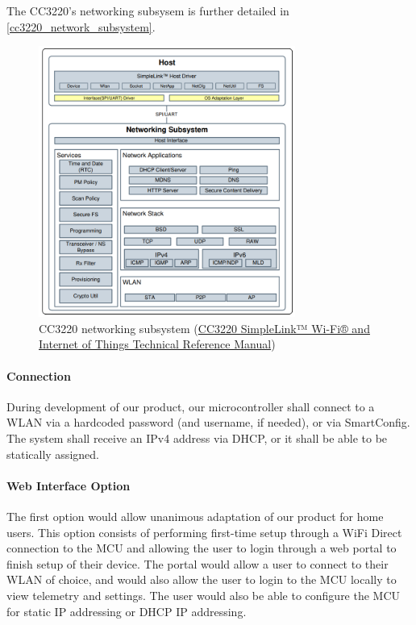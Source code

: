 The CC3220's networking subsysem is further detailed in
\autoref{cc3220_network_subsystem}.
\begin{figure}[H]
    \caption{CC3220 networking subsystem (\href{https://www.ti.com/lit/ug/swru455m/swru455m.pdf}{CC3220 SimpleLink™ Wi-Fi® and Internet of Things Technical Reference Manual})}
    \label{cc3220_network_subsystem}
    \centering
    \includegraphics[width=0.75\textwidth]{images/cc3220_network_subsystem.png}
\end{figure}
\paragraph{Connection}
During development of our product, our microcontroller shall connect to a WLAN via a hardcoded password (and username, if needed), or via SmartConfig. The system shall receive an IPv4 address via DHCP, or it shall be able to be statically assigned.

\paragraph{Web Interface Option}
The first option would allow unanimous adaptation of
our product for home users. This option consists of performing first-time
setup through a WiFi Direct connection to the MCU and allowing the user
to login through a web portal to finish setup of their device. The portal
would allow a user to connect to their WLAN of choice, and would
also allow the user to login to the MCU locally to view telemetry and 
settings. The user would also be able to configure the MCU for static
IP addressing or DHCP IP addressing.

